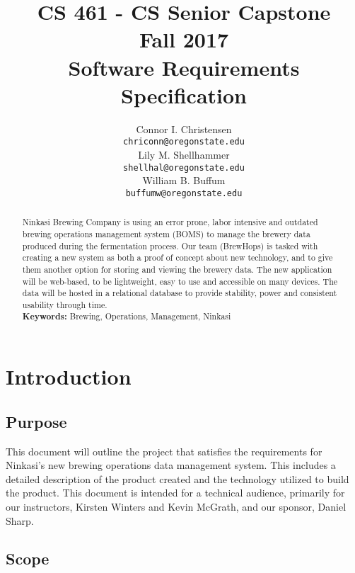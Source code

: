 \documentclass[draftclsnofoot,onecolumn,letterpaper,10pt,compsoc]{IEEEtran}
\title{CS 461 - CS Senior Capstone
	\\Fall 2017
	\\Software Requirements Specification
}
\author{
	Connor I. Christensen \\
	\texttt{chriconn@oregonstate.edu}
	\\
	Lily M. Shellhammer \\
	\texttt{shellhal@oregonstate.edu}
	\\
	William B. Buffum \\
	\texttt{buffumw@oregonstate.edu}
}
\begin{document}
\begin{titlingpage}
    \maketitle
    \begin{abstract}
			Ninkasi Brewing Company is using an error prone, labor intensive and outdated brewing operations management system (BOMS) to manage the brewery data produced during the fermentation process.
			Our team (BrewHops) is tasked with creating a new system as both a proof of concept about new technology, and to give them another option for storing and viewing the brewery data.
			The new application will be web-based, to be lightweight, easy to use and accessible on many devices.
			The data will be hosted in a relational database to provide stability, power and consistent usability through time.
			\\
			\textbf{Keywords:} Brewing, Operations, Management, Ninkasi
    \end{abstract}
		\pagebreak
		\tableofcontents
\end{titlingpage}

\section{Introduction}
	\subsection{Purpose}
		This document will outline the project that satisfies the requirements for Ninkasi’s new brewing operations data management system.
		This includes a detailed description of the product created and the technology utilized to build the product.
		This document is intended for a technical audience, primarily for our instructors, Kirsten Winters and Kevin McGrath, and our sponsor, Daniel Sharp.


	\subsection{Scope}
\end{document}

